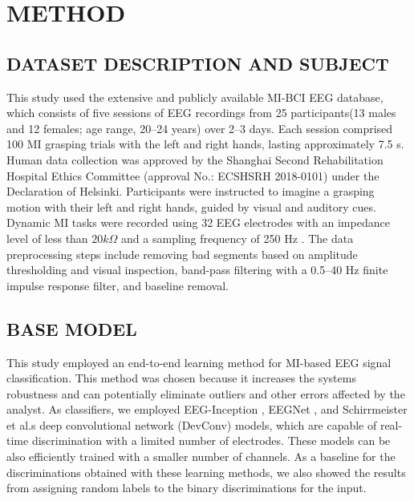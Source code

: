 

\section{METHOD}
\subsection{DATASET DESCRIPTION AND SUBJECT}
This study used the extensive and publicly available MI-BCI EEG database, which
consists of five sessions of EEG recordings from 25 participants(13 males
and 12 females; age range, 20–24 years) over 2–3 days. Each session
comprised 100 MI grasping trials with the left and right hands, lasting approximately
7.5 s. Human data collection was approved by the Shanghai Second
Rehabilitation Hospital Ethics Committee (approval No.: ECSHSRH 2018-0101)
under the Declaration of Helsinki. Participants were instructed to imagine
a grasping motion with their left and right hands, guided by visual and
auditory cues. Dynamic MI tasks were recorded using 32 EEG electrodes with an
impedance level of less than $20 k\Omega$ and a sampling frequency of 250 Hz
\cite{ma2022large}. The data preprocessing steps include removing bad segments based on
amplitude thresholding and visual inspection, band-pass filtering with a
0.5--40 Hz finite impulse response filter, and baseline removal.
\subsection{BASE MODEL}
This study employed an end-to-end learning method for MI-based EEG signal
classification. This method was chosen because it increases the systems robustness
and can potentially eliminate outliers and other errors affected by the analyst.
As classifiers, we employed EEG-Inception \cite{zhang2021eeg}, EEGNet \cite{lawhern2018eegnet}, and Schirrmeister
et al.s \cite{schirrmeister2017deep} deep convolutional network (DevConv) models, which are capable
of real-time discrimination with a limited number of electrodes. These models
can be also efficiently trained with a smaller number of channels. As a
baseline for the discriminations obtained with these learning methods, we also
showed the results from assigning random labels to the binary discriminations
for the input.

